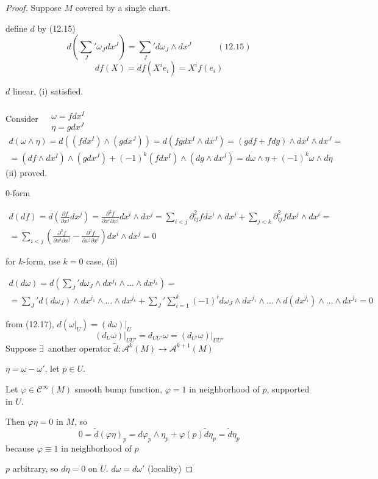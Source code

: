 \begin{proof}
  Suppose $M$ covered by a single chart.  

define $d$ by (12.15) 
\[
d\left( \sum_J' \omega_J dx^J \right) = \sum_J' d\omega_J \wedge dx^J \quad \quad \quad (12.15) 
\]
\[
df(X) = df(X^i e_i ) = X^i f(e_i)
\]

$d$ linear, (i) satisfied.  

Consider $\begin{aligned} & \quad \\ & \omega = fdx^I \\ & \eta = gdx^J \end{aligned}$ 
\[
\begin{gathered}
  d(\omega \wedge \eta) = d((fdx^I ) \wedge (g dx^J)) = d(fg dx^I \wedge dx^J) = (gdf + fdg) \wedge dx^I \wedge dx^J = \\
   = (df \wedge dx^I) \wedge (gdx^J) + (-1)^k( fdx^I ) \wedge (dg \wedge dx^J) = d\omega \wedge \eta + (-1)^k \omega \wedge d\eta
\end{gathered}
\]
(ii) proved.  

0-form

\[
\begin{gathered}
  d(df) = d \left( \frac{ \partial f}{ \partial x^j} dx^j \right) = \frac{ \partial^2 f}{ \partial x^i \partial x^j} dx^i \wedge dx^j = \sum_{ i < j } \partial^2_{ij} f dx^i \wedge dx^j + \sum_{j < k } \partial^2_{ij} f dx^j \wedge dx^i = \\
   = \sum_{i < j } \left( \frac{ \partial^2 f}{ \partial x^i \partial x^j} - \frac{ \partial^2 f}{ \partial x^j \partial x^i } \right) dx^i \wedge dx^j = 0 
\end{gathered}
\]

for $k$-form, use $k=0$ case, (ii)

\[
\begin{gathered}
  d(d\omega) = d\left( \sum_J' d\omega_J \wedge dx^{j_1} \wedge \dots \wedge dx^{j_k} \right) = \\
  = \sum_J' d(d \omega_J) \wedge dx^{j_1} \wedge \dots \wedge dx^{j_k} + \sum_J' \sum_{i=1}^k (-1)^i d\omega_J \wedge dx^{j_1} \wedge \dots \wedge d(dx^{j_i}) \wedge \dots \wedge dx^{j_k} = 0 
\end{gathered}
\]

from (12.17), $d( \left. \omega \right|_U ) = \left. (d\omega ) \right|_U$
\[
\left. (d_U \omega) \right|_{UU'} = d_{UU'} \omega = \left. (d_{U'} \omega) \right|_{UU'}
\]
Suppose $\exists \, $ another operator $\widetilde{d} : \mathcal{A}^k(M) \to \mathcal{A}^{k+1}(M)$

$\eta = \omega - \omega'$, let $p\in U$. 

Let $\varphi \in \mathcal{C}^{\infty}(M)$ smooth bump function, $\varphi =1$ in neighborhood of $p$, supported in $U$.  

Then $\varphi \eta =0 $ in $M$, so 
\[
 0 = \widetilde{d}(\varphi \eta)_p = d\varphi_p \wedge \eta_p  + \varphi(p) \widetilde{d}\eta_p = \widetilde{d}\eta_p
\]
because $\varphi \equiv 1$ in neighborhood of $p$

$p$ arbitrary, so $d\eta = 0$ on $U$.  $d\omega = d\omega'$ (locality)

\end{proof}

